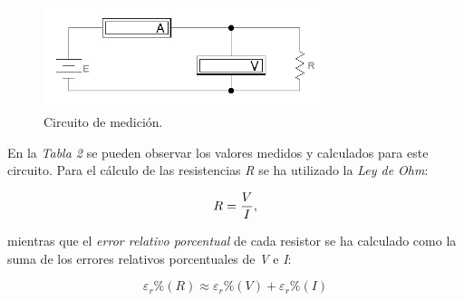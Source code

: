 \documentclass{article}
\begin{document}
\begin{figure}[h]
	\centering
	\includegraphics[width=0.72\textwidth]{images/p2-item-a.jpg}
	\caption{Circuito de medición.}
\end{figure}
\bigskip\bigskip


\noindent En la \textit{Tabla 2} se pueden observar los valores medidos y calculados para este circuito. Para el cálculo de las resistencias \textit{R} se ha utilizado la \textit{Ley de Ohm}:
\medskip

\begin{equation}
 	R = {V \over I},
\end{equation}
\medskip

\noindent mientras que el \textit{error relativo porcentual} de cada resistor se ha calculado como la suma de los errores relativos porcentuales de \textit{V} e \textit{I}:
\medskip

\begin{equation}
 	\varepsilon_r\%(R) \approx \varepsilon_r\%(V) + \varepsilon_r\%(I)
\end{equation}
\bigskip
\end{document}
